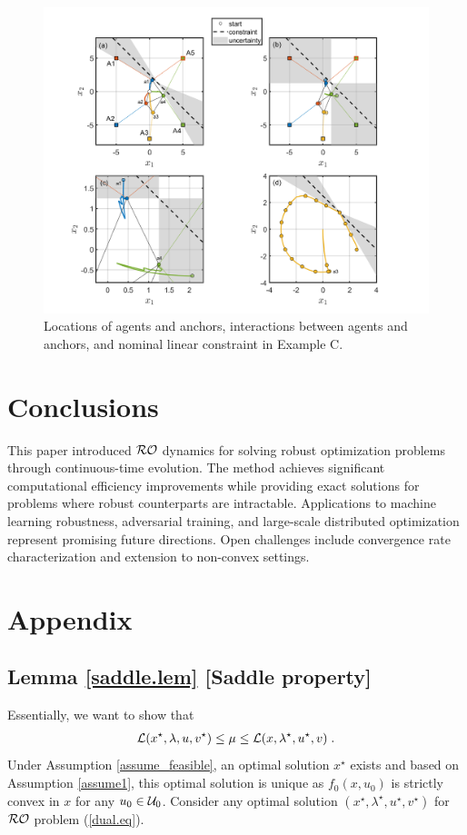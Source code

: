 \documentclass[journal,twoside,web]{ieeecolor}
\newcommand{\rev}[1]{\textcolor{revisionblue}{#1}}
\begin{document}
\begin{figure}
\begin{center}
\includegraphics[scale=0.26]{simulation_figure_finalv3.png}
\vspace{-1.5mm}
\caption{\rev{Locations of agents and anchors, interactions between agents and anchors, and nominal linear constraint in Example C.}}
\label{fig_points}
\end{center}
\end{figure}

\section{Conclusions}\label{section_conclusions}


\rev{This paper introduced ${\cal RO}$ dynamics for solving robust optimization problems through continuous-time evolution. The method achieves significant computational efficiency improvements while providing exact solutions for problems where robust counterparts are intractable. Applications to machine learning robustness, adversarial training, and large-scale distributed optimization represent promising future directions. Open challenges include convergence rate characterization and extension to non-convex settings.}
\section{Appendix} \label{section_appendix}

\subsection{Lemma \ref{saddle.lem} [Saddle property]}
Essentially, we want to show that
\begin{align*}
{\cal L}(x^\star,\lambda,u,v^\star)\leq \mu \leq {\cal L}(x,\lambda^\star,u^\star,v)\;.
\end{align*}
Under Assumption \ref{assume_feasible}, an optimal solution $x^\star$ exists and based on Assumption \ref{assume1}, this optimal solution is unique as $f_0(x,u_0)$ is strictly convex in $x$ for any $u_0 \in{\cal U}_0$. Consider any optimal solution $(x^\star,\lambda^\star,u^\star,v^\star)$ for ${\cal RO}$ problem (\ref{dual.eq}).
\end{document}
